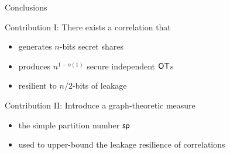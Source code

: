 \begin{frame}{Conclusions}

	{
		\begin{block} {Contribution I: There exists a correlation that}
			\begin{itemize}
				\item generates $ n $-bits secret shares
				\item produces $ n^{1-o(1)} $ secure independent $\OT$s
				\item resilient to $ n/2 $-bits of leakage 
			\end{itemize}
		\end{block}
		
		\pause
		
		\begin{block} {Contribution II: Introduce a graph-theoretic measure}
			\begin{itemize}
				\item the simple partition number $ \mathsf{sp} $
				\item used to upper-bound the leakage resilience of correlations 
			\end{itemize}
		\end{block}
		
	}


\end{frame}